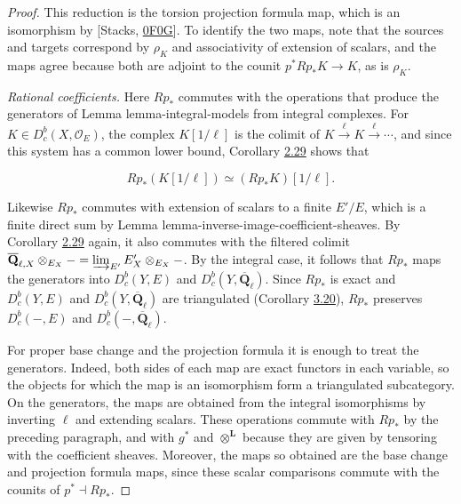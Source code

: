 \documentclass[11pt]{article}
\providecommand{\Dbc}{}\renewcommand{\Dbc}{D^b_c}
\providecommand{\QbarX}{}\renewcommand{\QbarX}{\overline{\mathbf Q}_{\ell,X}}
\begin{document}
\begin{proof}[{Proof}]
This reduction is the torsion projection formula map, which is an isomorphism by [Stacks, \href{https://stacks.math.columbia.edu/tag/0F0G}{0F0G}]. To identify the two maps, note that the sources and targets correspond by \(\rho_K\) and associativity of extension of scalars, and the maps agree because both are adjoint to the counit \(p^*Rp_*K\to K\), as is \(\rho_K\).

\emph{Rational coefficients.} Here \(Rp_*\) commutes with the operations that produce the generators of Lemma lemma-integral-models from integral complexes. For \(K\in\Dbc(X,\mathcal O_E)\), the complex \(K[1/\ell]\) is the colimit of \(K\xrightarrow{\ell}K\xrightarrow{\ell}\cdots\), and since this system has a common lower bound, Corollary \hyperref[bp86]{2.29} shows that

\[
Rp_*(K[1/\ell])\simeq(Rp_*K)[1/\ell].
\]

Likewise \(Rp_*\) commutes with extension of scalars to a finite \(E'/E\), which is a finite direct sum by Lemma lemma-inverse-image-coefficient-sheaves. By Corollary \hyperref[bp86]{2.29} again, it also commutes with the filtered colimit \(\QbarX\otimes_{E_X}-=\varinjlim_{E'}E'_X\otimes_{E_X}-\). By the integral case, it follows that \(Rp_*\) maps the generators into \(\Dbc(Y,E)\) and \(\Dbc(Y,\overline{\mathbf Q}_\ell)\). Since \(Rp_*\) is exact and \(\Dbc(Y,E)\) and \(\Dbc(Y,\overline{\mathbf Q}_\ell)\) are triangulated (Corollary \hyperref[bp253]{3.20}), \(Rp_*\) preserves \(\Dbc(-,E)\) and \(\Dbc(-,\overline{\mathbf Q}_\ell)\).

For proper base change and the projection formula it is enough to treat the generators. Indeed, both sides of each map are exact functors in each variable, so the objects for which the map is an isomorphism form a triangulated subcategory. On the generators, the maps are obtained from the integral isomorphisms by inverting \(\ell\) and extending scalars. These operations commute with \(Rp_*\) by the preceding paragraph, and with \(g^*\) and \(\otimes^{\mathbf L}\) because they are given by tensoring with the coefficient sheaves. Moreover, the maps so obtained are the base change and projection formula maps, since these scalar comparisons commute with the counits of \(p^*\dashv Rp_*\).
\end{proof}



\end{document}
